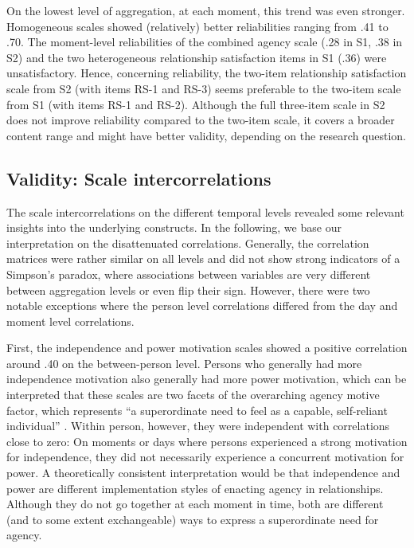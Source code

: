 \documentclass[jou,a4paper,draftfirst]{apa6}\usepackage[]{graphicx}\usepackage[]{color}
\begin{document}
On the lowest level of aggregation, at each moment, this trend was even stronger. Homogeneous scales showed (relatively) better reliabilities ranging from .41 to .70. The moment-level reliabilities of the combined agency scale (.28 in S1, .38 in S2) and the two heterogeneous relationship satisfaction items in S1 (.36) were unsatisfactory. Hence, concerning reliability, the two-item relationship satisfaction scale from S2 (with items RS-1 and RS-3) seems preferable to the two-item scale from S1 (with items RS-1 and RS-2). Although the full three-item scale in S2 does not improve reliability compared to the two-item scale, it covers a broader content range and might have better validity, depending on the research question.

\subsection{Validity: Scale intercorrelations}

The scale intercorrelations on the different temporal levels revealed some relevant insights into the underlying constructs. In the following, we base our interpretation on the disattenuated correlations. Generally, the correlation matrices were rather similar on all levels and did not show strong indicators of a Simpson's paradox, where associations between variables are very different between aggregation levels or even flip their sign.  However, there were two notable exceptions where the person level correlations differed from the day and moment level correlations. 

First, the independence and power motivation scales showed a positive correlation around .40 on the between-person level. Persons who generally had more independence motivation also generally had more power motivation, which can be interpreted that these scales are two facets of the overarching agency motive factor, which represents ``a superordinate need to feel as a capable, self-reliant individual'' \parencite[][p. 3]{hagemeyer_AssessingImplicitMotivational_2012}. Within person, however, they were independent with correlations close to zero: On moments or days where persons experienced a strong motivation for independence, they did not necessarily experience a concurrent motivation for power. A theoretically consistent interpretation would be that independence and power are different implementation styles of enacting agency in relationships. Although they do not go together at each moment in time, both are different (and to some extent exchangeable) ways to express a superordinate need for agency. 
\end{document}
